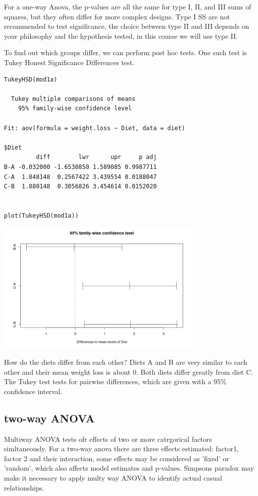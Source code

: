 \documentclass{article}
\begin{document}
For a one-way Anova, the p-values are all the same for type I, II, and III sums of squares, but they often differ for more complex designs. Type I SS are not recommended to test significance, the choice between type II and III depends on your philosophy and the hypothesis tested, in this course we will use type II.\par 

To find out which groups differ, we can perform post hoc tests. One such test is Tukey Honest Significance Differences test.

\begin{lstlisting}
TukeyHSD(mod1a)

  Tukey multiple comparisons of means
    95% family-wise confidence level

Fit: aov(formula = weight.loss ~ Diet, data = diet)

$Diet
         diff        lwr      upr     p adj
B-A -0.032000 -1.6530850 1.589085 0.9987711
C-A  1.848148  0.2567422 3.439554 0.0188047
C-B  1.880148  0.3056826 3.454614 0.0152020


plot(TukeyHSD(mod1a))
\end{lstlisting}
\begin{center}
    \includegraphics[width = 0.75\textwidth]{lab2/posthoc.png}
\end{center}

How do the diets differ from each other? Diets A and B are very similar to each other and their mean weight loss is about 0. Both diets differ greatly from diet C. The Tukey test tests for pairwise differences, which are given with a 95\% confidence interval.\par 

\subsection{two-way ANOVA}
Multiway ANOVA tests ofr effects of two or more catrgorical factors simltaneously. For a two-way anova there are three effects estimated: factor1, factor 2 and their interaction, some effects may be considered as 'fixed' or 'random', which also affects model estimates and p-values. Simpsons paradox may make it necessary to apply multy way ANOVA to identify actual casual relationships.
\end{document}
